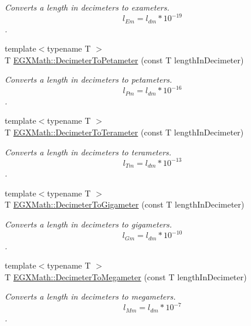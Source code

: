 \begin{DoxyCompactItemize}
\begin{DoxyCompactList}\small\item\em Converts a length in decimeters to exameters. \[ l_{Em}=l_{dm} * 10^{-19} \]. \end{DoxyCompactList}\item 
{\footnotesize template$<$typename T $>$ }\\T \mbox{\hyperlink{group___e_g_x_math-_conversions-_length_conversions-_decimeter-_s_i_gaaaaf9805ec7a853f4d9ae242baf3908a}{E\+G\+X\+Math\+::\+Decimeter\+To\+Petameter}} (const T length\+In\+Decimeter)
\begin{DoxyCompactList}\small\item\em Converts a length in decimeters to petameters. \[ l_{Pm}=l_{dm} * 10^{-16} \]. \end{DoxyCompactList}\item 
{\footnotesize template$<$typename T $>$ }\\T \mbox{\hyperlink{group___e_g_x_math-_conversions-_length_conversions-_decimeter-_s_i_ga182e057812e247aa0058051c08e29bee}{E\+G\+X\+Math\+::\+Decimeter\+To\+Terameter}} (const T length\+In\+Decimeter)
\begin{DoxyCompactList}\small\item\em Converts a length in decimeters to terameters. \[ l_{Tm}=l_{dm} * 10^{-13} \]. \end{DoxyCompactList}\item 
{\footnotesize template$<$typename T $>$ }\\T \mbox{\hyperlink{group___e_g_x_math-_conversions-_length_conversions-_decimeter-_s_i_gab3fcc85ff18a685480d182d95da4d60b}{E\+G\+X\+Math\+::\+Decimeter\+To\+Gigameter}} (const T length\+In\+Decimeter)
\begin{DoxyCompactList}\small\item\em Converts a length in decimeters to gigameters. \[ l_{Gm}=l_{dm} * 10^{-10} \]. \end{DoxyCompactList}\item 
{\footnotesize template$<$typename T $>$ }\\T \mbox{\hyperlink{group___e_g_x_math-_conversions-_length_conversions-_decimeter-_s_i_ga093ff7a928de0bc92d2dd57c2c3d0a60}{E\+G\+X\+Math\+::\+Decimeter\+To\+Megameter}} (const T length\+In\+Decimeter)
\begin{DoxyCompactList}\small\item\em Converts a length in decimeters to megameters. \[ l_{Mm}=l_{dm} * 10^{-7} \]. \end{DoxyCompactList}\item 

\end{DoxyCompactItemize}
